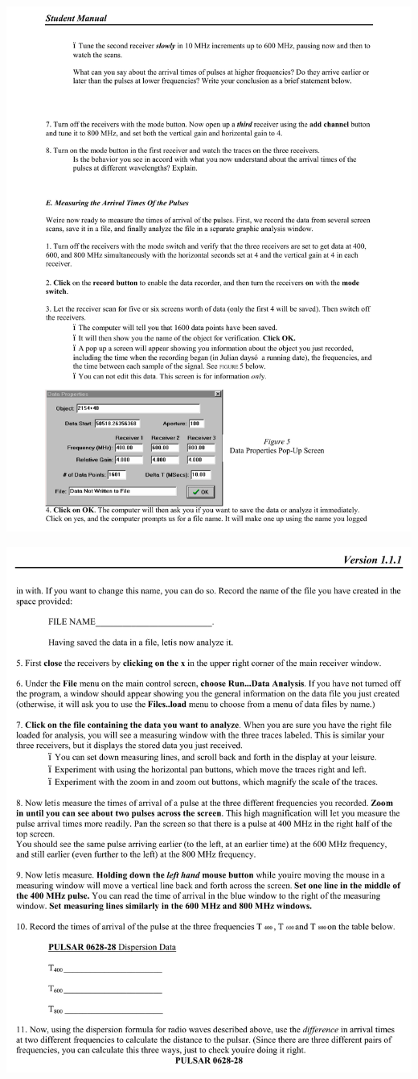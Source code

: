 \includegraphics[width=\textwidth]{pulsars/pulsar10.pdf}
\vfil\eject

\includegraphics[width=\textwidth]{pulsars/pulsar11.pdf}
\vfil\eject

